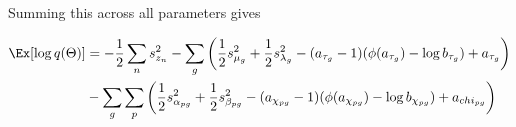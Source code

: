 Summing this across all parameters gives

\begin{equation}
\begin{aligned}
\Ex[\log q(\Theta)] &= -\frac{1}{2} \sum_n s_{z_n}^2 -
\sum_g \left( \frac{1}{2} s_{\mu_g}^2 + \frac{1}{2} s_{\lambda_g}^2 -
(a_{\tau_g} - 1)( \phi(a_{\tau_g}) - \log b_{\tau_g}) + a_{\tau_g} \right) \\
& - \sum_g \sum_p \left(
\frac{1}{2} s_{\alpha_{pg}}^2 + \frac{1}{2} s_{\beta_{pg}}^2 -
(a_{\chi_{pg}} - 1)( \phi(a_{\chi_{pg}}) - \log b_{\chi_{pg}}) + a_{chi_{pg}} \right)
\end{aligned}
\end{equation}
